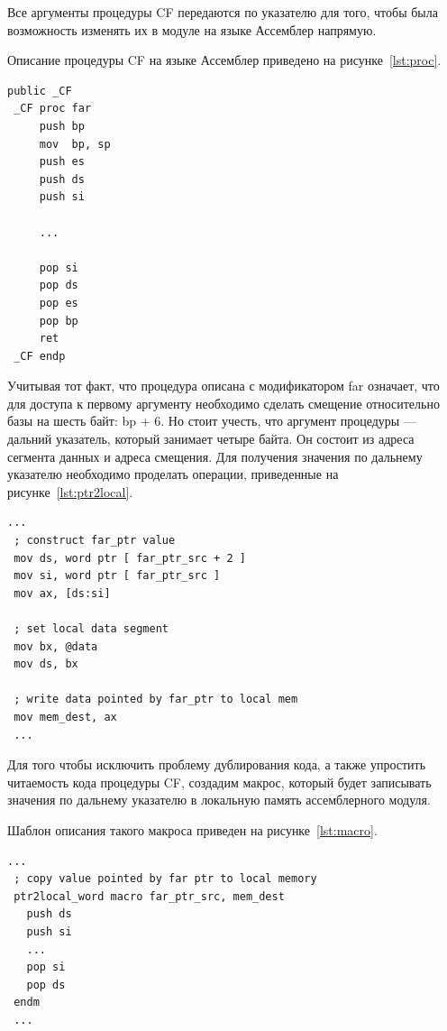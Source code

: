 Все аргументы процедуры CF передаются по указателю для того, чтобы была возможность
изменять их в модуле на языке Ассемблер напрямую.

\newpage
Описание процедуры CF на языке Ассемблер приведено на рисунке~\ref{lst:proc}.
\begin{lstlisting}[caption=Описание процедуры на языке Ассемблер,
label=lst:proc,language={[x86masm]Assembler},basicstyle=\scriptsize\ttfamily]
 public _CF
 _CF proc far
     push bp
     mov  bp, sp
     push es
     push ds
     push si

     ...

     pop si
     pop ds
     pop es
     pop bp
     ret
 _CF endp
\end{lstlisting}

Учитывая тот факт, что процедура описана с модификатором far означает, что для
доступа к первому аргументу необходимо сделать смещение относительно базы на
шесть байт: bp + 6. Но стоит учесть, что аргумент процедуры --- дальний указатель,
который занимает четыре байта. Он состоит из адреса сегмента данных и адреса смещения.
Для получения значения по дальнему указателю необходимо проделать операции,
приведенные на рисунке~\ref{lst:ptr2local}.

\begin{lstlisting}[label=lst:ptr2local,caption={Запись значения, получаемого
по дальнему указателю в локальную память},language={[x86masm]Assembler},basicstyle=\scriptsize\ttfamily]
 ...
 ; construct far_ptr value
 mov ds, word ptr [ far_ptr_src + 2 ]
 mov si, word ptr [ far_ptr_src ]
 mov ax, [ds:si]

 ; set local data segment
 mov bx, @data
 mov ds, bx

 ; write data pointed by far_ptr to local mem
 mov mem_dest, ax
 ...
\end{lstlisting}

Для того чтобы исключить проблему дублирования кода, а также упростить читаемость
кода процедуры CF, создадим макрос, который будет записывать значения по дальнему
указателю в локальную память ассемблерного модуля.

Шаблон описания такого макроса приведен на рисунке~\ref{lst:macro}.
\begin{lstlisting}[label=lst:macro,caption={Шаблон описания макроса, используемого
  для записи значения в локальную память по дальнему указателю},
  language={[x86masm]Assembler},basicstyle=\scriptsize\ttfamily]
 ...
 ; copy value pointed by far ptr to local memory
 ptr2local_word macro far_ptr_src, mem_dest
   push ds
   push si
   ...
   pop si
   pop ds
 endm
 ...
\end{lstlisting}


